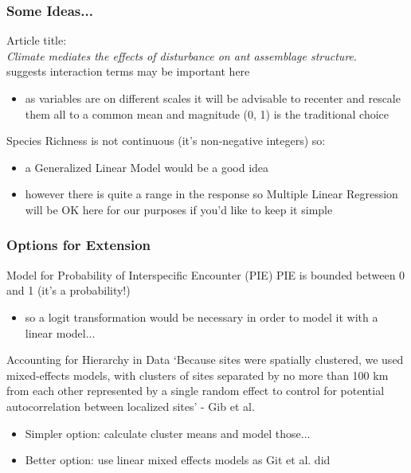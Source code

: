 \documentclass[xcolor=dvipsnames]{beamer}
\begin{document}
\begin{frame}
\frametitle{Some Ideas...}

Article title:\\
\textit{Climate mediates the effects of disturbance on ant assemblage structure}.\\
suggests interaction terms may be important here \begin{itemize}
 \item as variables are on different scales it will be advisable to recenter and rescale them all to a common mean and magnitude (0, 1) is the traditional choice
\newline
\end{itemize}
Species Richness is not continuous (it's non-negative integers) so: \begin{itemize}
\item a Generalized Linear Model would be a good idea
\item however there is quite a range in the response so Multiple Linear Regression will be OK here for our purposes if you'd like to keep it simple
\newline
\end{itemize} 
\end{frame}


\begin{frame}
\frametitle{Options for Extension}

\begin{block}{Model for Probability of Interspecific Encounter (PIE)}
PIE is bounded between 0 and 1 (it's a probability!) \begin{itemize}
\item so a logit transformation would be necessary in order to model it with a linear model...\end{itemize}
\end{block}

\begin{block}{Accounting for Hierarchy in Data}
`Because sites were spatially clustered, we used mixed-effects models, with clusters of sites separated by no more than 100 km from each other represented by a single random effect to control for potential autocorrelation between localized sites' - Gib et al.
\begin{itemize}
\item Simpler option: calculate cluster means and model those...
\item Better option: use linear mixed effects models as Git et al. did  \end{itemize}
\end{block}

\end{frame}
\end{document}
